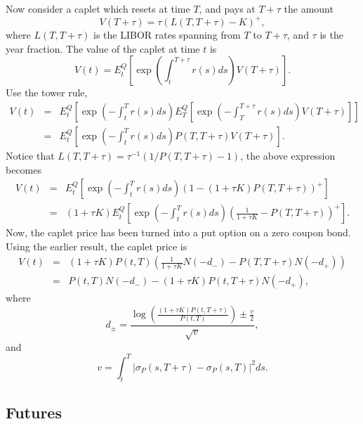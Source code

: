 \documentclass[12pt]{article}
\begin{document}
    Now consider a caplet which resets at time $T$, and pays at $T+\tau$ the amount
    \begin{equation}
      V(T+\tau) = \tau\left(L(T,T+\tau)-K\right)^+,
    \end{equation}
    where $L(T,T+\tau)$ is the LIBOR rates spanning from $T$ to $T+\tau$, and $\tau$
    is the year fraction. The value of the caplet at time $t$ is
    \begin{equation}
      V(t)=E_t^Q\left[\exp\left(\int_t^{T+\tau}r(s)ds\right)V(T+\tau)\right].
    \end{equation}
    Use the tower rule,
    \begin{eqnarray}
      V(t)&=&E_t^Q\left[\exp\left(-\int_t^{T}r(s)ds\right)E_T^Q\left[\exp\left(-\int_T^{T+\tau}r(s)ds\right)V(T+\tau)\right]\right]\nonumber\\
          &=&E_t^Q\left[\exp\left(-\int_t^{T}r(s)ds\right)P(T,T+\tau)V(T+\tau)\right].
    \end{eqnarray}
    Notice that $L(T,T+\tau)=\tau^{-1}(1/P(T,T+\tau)-1)$, the above expression becomes
    \begin{eqnarray}
      V(t)&=&E_t^Q\left[\exp\left(-\int_t^{T}r(s)ds\right)\left(1-\left(1+\tau K\right)P(T,T+\tau)\right)^+\right]\nonumber\\
          &=&(1+\tau K)E_t^Q\left[\exp\left(-\int_t^{T}r(s)ds\right)\left(\frac{1}{1+\tau K}-P(T,T+\tau)\right)^+\right].
    \end{eqnarray}
    Now, the caplet price has been turned into a put option on a zero coupon bond. Using the earlier result, the caplet price is
    \begin{eqnarray}
      V(t)&=&(1+\tau K)P(t,T)\left(\frac{1}{1+\tau K}N(-d_-)-P(T,T+\tau)N(-d_+)\right)\nonumber\\
          &=&P(t,T)N(-d_-)-(1+\tau K)P(t,T+\tau)N(-d_+),
    \end{eqnarray}
    where
    \begin{equation}
      d_{\pm} = \frac{\displaystyle\log\left(\frac{(1+\tau K)P(t,T+\tau)}{P(t,T)}\right)\pm \frac{v}{2}}{\sqrt{v}},
    \end{equation}
    and
    \begin{equation}
      v=\int_t^T\left|\sigma_P(s,T+\tau)-\sigma_P(s,T)\right|^2ds.
    \end{equation}
  
  \subsection{Futures}
  
\end{document}
